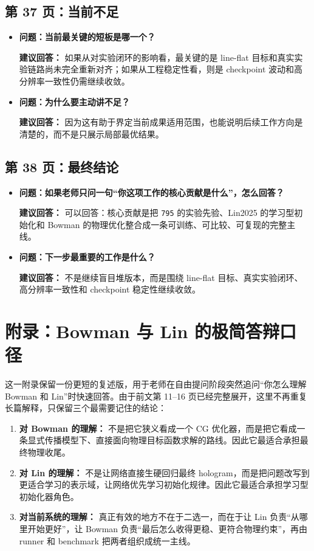 \documentclass[12pt,a4paper]{ctexart}
\begin{document}
\subsection{第 37 页：当前不足}
\begin{itemize}
\item \textbf{问题：当前最关键的短板是哪一个？}

\textbf{建议回答：} 如果从对实验闭环的影响看，最关键的是 line-flat 目标和真实实验链路尚未完全重新对齐；如果从工程稳定性看，则是 checkpoint 波动和高分辨率一致性仍需继续收敛。

\item \textbf{问题：为什么要主动讲不足？}

\textbf{建议回答：} 因为这有助于界定当前成果适用范围，也能说明后续工作方向是清楚的，而不是只展示局部最优结果。
\end{itemize}

\subsection{第 38 页：最终结论}
\begin{itemize}
\item \textbf{问题：如果老师只问一句“你这项工作的核心贡献是什么”，怎么回答？}

\textbf{建议回答：} 可以回答：核心贡献是把 \texttt{795} 的实验先验、Lin2025 的学习型初始化和 Bowman 的物理优化整合成一条可训练、可比较、可复现的完整主线。

\item \textbf{问题：下一步最重要的工作是什么？}

\textbf{建议回答：} 不是继续盲目堆版本，而是围绕 line-flat 目标、真实实验闭环、高分辨率一致性和 checkpoint 稳定性继续收敛。
\end{itemize}

\section{附录：Bowman 与 Lin 的极简答辩口径}

这一附录保留一份更短的复述版，用于老师在自由提问阶段突然追问“你怎么理解 Bowman 和 Lin”时快速回答。由于前文第 11--16 页已经完整展开，这里不再重复长篇解释，只保留三个最需要记住的结论：

\begin{enumerate}[label=\arabic*.]
\item \textbf{对 Bowman 的理解：}
不是把它狭义看成一个 CG 优化器，而是把它看成一条显式传播模型下、直接面向物理目标函数求解的路线。因此它最适合承担最终物理收尾。

\item \textbf{对 Lin 的理解：}
不是让网络直接生硬回归最终 hologram，而是把问题改写到更适合学习的表示域，让网络优先学习初始化规律。因此它最适合承担学习型初始化器角色。

\item \textbf{对当前系统的理解：}
真正有效的地方不在于二选一，而在于让 Lin 负责“从哪里开始更好”，让 Bowman 负责“最后怎么收得更稳、更符合物理约束”，再由 runner 和 benchmark 把两者组织成统一主线。
\end{enumerate}
\end{document}
